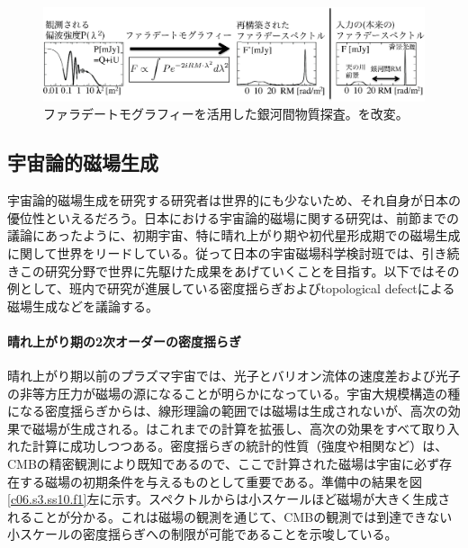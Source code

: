 \begin{figure}[tbp]
\begin{center}
\includegraphics[width=0.9\linewidth]{magnetism/c06.s3.ss9.f2.eps}
\end{center}
\caption{ファラデートモグラフィーを活用した銀河間物質探査。\citet{2014PASJ...66...65A}を改変。
}\label{c06.s3.ss9.f2}
\end{figure}


\subsection{宇宙論的磁場生成}
\label{c06.s3.ss10}

宇宙論的磁場生成を研究する研究者は世界的にも少ないため、それ自身が日本の優位性といえるだろう。日本における宇宙論的磁場に関する研究は、前節までの議論にあったように、初期宇宙、特に晴れ上がり期や初代星形成期での磁場生成に関して世界をリードしている。従って日本の宇宙磁場科学検討班では、引き続きこの研究分野で世界に先駆けた成果をあげていくことを目指す。以下ではその例として、班内で研究が進展している密度揺らぎおよびtopological defectによる磁場生成などを議論する。

\paragraph{晴れ上がり期の2次オーダーの密度揺らぎ}

晴れ上がり期以前のプラズマ宇宙では、光子とバリオン流体の速度差および光子の非等方圧力が磁場の源になることが明らかになっている\citep{2006Sci...311..827I}。宇宙大規模構造の種になる密度揺らぎからは、線形理論の範囲では磁場は生成されないが、高次の効果で磁場が生成される。\cite{Saga.et.al.2015}はこれまでの計算を拡張し、高次の効果をすべて取り入れた計算に成功しつつある。密度揺らぎの統計的性質（強度や相関など）は、CMBの精密観測により既知であるので、ここで計算された磁場は宇宙に必ず存在する磁場の初期条件を与えるものとして重要である。準備中の結果を図\ref{c06.s3.ss10.f1}左に示す。スペクトルからは小スケールほど磁場が大きく生成されることが分かる。これは磁場の観測を通じて、CMBの観測では到達できない小スケールの密度揺らぎへの制限が可能であることを示唆している。

